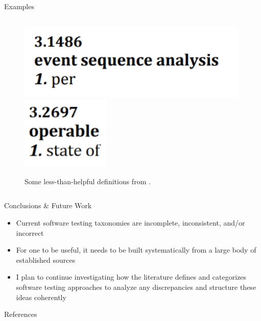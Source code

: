 \documentclass[22pt]{beamer}
\begin{document}
\begin{frame}[fragile]
\begin{textblock}{7.25}
\begin{block}{\fontsize{37}{20}\selectfont Examples}
\begin{columns}
\begin{column}{0.4\textwidth}
\begin{center}
\begin{figure}
                            \includegraphics[height=3.7cm]{per.png}
                            \includegraphics[height=3.5cm]{state of.png}
                            \label{Fig:unhelpful-defs}
                            \caption{Some less-than-helpful definitions from \cite{IEEE2017}.}
                        \end{figure}
                    \end{center}
                \end{column}
            \end{columns}
        \end{block}

        \begin{block}{\fontsize{37}{20}\selectfont Conclusions \& Future Work}
            \begin{itemize}
                \item Current software testing taxonomies are incomplete,
                      inconsistent, and/or incorrect
                \item For one to be useful, it needs to be built systematically
                      from a large body of established sources
                \item I plan to continue investigating how the literature defines
                      and categorizes software testing approaches to analyze any
                      discrepancies and structure these ideas coherently
            \end{itemize}
        \end{block}

        \begin{block}{\fontsize{37}{20}\selectfont References}
            
            {\fontsize{14}{15.75}\selectfont
                }
        \end{block}


\end{textblock}
\end{frame}
\end{document}
